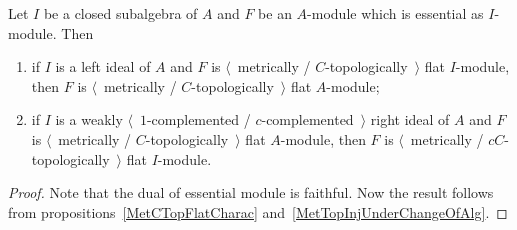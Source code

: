 \begin{proposition}\label{MetTopFlatUnderChangeOfAlg} Let $I$ be a closed
subalgebra of $A$ and $F$ be an $A$-module which is essential as $I$-module.
Then

\begin{enumerate}[label = (\roman*)]
    \item if $I$ is a left ideal of $A$ and $F$ is $\langle$~metrically /
    $C$-topologically~$\rangle$  flat $I$-module, then $F$ is
    $\langle$~metrically / $C$-topologically~$\rangle$ flat $A$-module;

    \item if $I$ is a weakly $\langle$~$1$-complemented / 
    $c$-complemented~$\rangle$ right ideal of $A$ and $F$ 
    is $\langle$~metrically / $C$-topologically~$\rangle$ flat $A$-module, 
    then $F$ is $\langle$~metrically / $cC$-topologically~$\rangle$ 
    flat $I$-module.
\end{enumerate}
\end{proposition}
\begin{proof} Note that the dual of essential module is faithful. Now the result
follows from propositions~\ref{MetCTopFlatCharac} 
and~\ref{MetTopInjUnderChangeOfAlg}.
\end{proof}    

